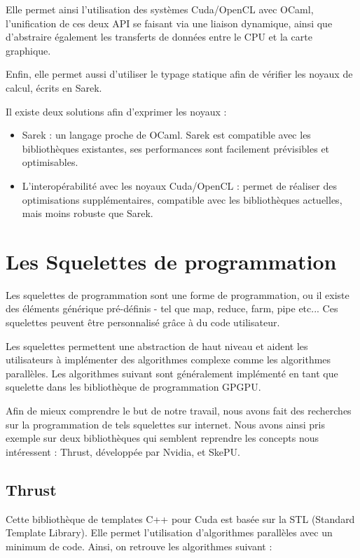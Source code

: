 \documentclass{report}
\begin{document}
Elle permet ainsi l’utilisation des systèmes Cuda/OpenCL avec OCaml, l’unification de ces deux API se faisant via une liaison dynamique, ainsi que d’abstraire également les transferts de données entre le CPU et la carte graphique.\newline

Enfin, elle permet aussi d’utiliser le typage statique afin de vérifier les noyaux de calcul, écrits en Sarek.\newline

Il existe deux solutions afin d’exprimer les noyaux :
\begin{itemize}
  
\item Sarek : un langage proche de OCaml. Sarek est compatible avec les bibliothèques existantes, ses performances sont facilement prévisibles et optimisables.
  
\item L’interopérabilité avec les noyaux Cuda/OpenCL : permet de réaliser des optimisations supplémentaires, compatible avec les bibliothèques actuelles, mais moins robuste que Sarek.


\end{itemize}


\section{Les Squelettes de programmation}
Les squelettes de programmation\cite{refSkeleton} sont une forme de programmation, ou il existe des éléments générique pré-définis - tel que map, reduce, farm, pipe etc... Ces squelettes peuvent être personnalisé grâce à du code utilisateur.\newline

Les squelettes permettent une abstraction de haut niveau et aident les utilisateurs à implémenter des algorithmes complexe comme les algorithmes parallèles. Les algorithmes suivant sont généralement implémenté en tant que squelette dans les bibliothèque de programmation GPGPU.\newline

Afin de mieux comprendre le but de notre travail, nous avons fait des recherches sur la programmation de tels squelettes sur internet. Nous avons ainsi pris exemple sur deux bibliothèques qui semblent reprendre les concepts nous intéressent : Thrust, développée par Nvidia, et SkePU.\newline

\subsection{Thrust}
Cette bibliothèque de templates C++ pour Cuda est basée sur la STL (Standard Template Library). Elle permet l’utilisation d’algorithmes parallèles avec un minimum de code. Ainsi, on retrouve les algorithmes suivant :
\end{document}
